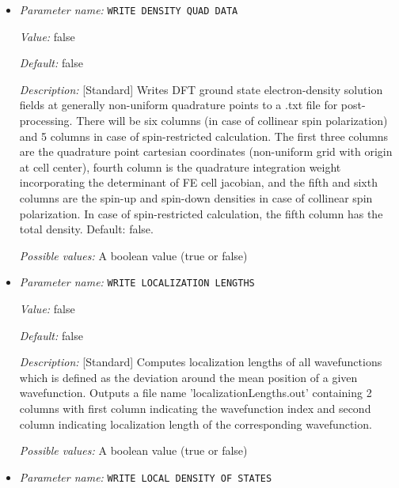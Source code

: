 \begin{itemize}
{\it Possible values:} A boolean value (true or false)
\item {\it Parameter name:} {\tt WRITE DENSITY QUAD DATA}
\label{parameters:Post_2dprocessing Options/WRITE DENSITY QUAD DATA}
\label{parameters:Post_2dprocessing_20Options/WRITE_20DENSITY_20QUAD_20DATA}


{\it Value:} false


{\it Default:} false


{\it Description:} [Standard] Writes DFT ground state electron-density solution fields at generally non-uniform quadrature points to a .txt file for post-processing. There will be six columns (in case of collinear spin polarization) and 5 columns in case of spin-restricted calculation. The first three columns are the quadrature point cartesian coordinates (non-uniform grid with origin at cell center), fourth column is the quadrature integration weight incorporating the determinant of FE cell jacobian, and the fifth and sixth columns are the spin-up and spin-down densities in case of collinear spin polarization. In case of spin-restricted calculation, the fifth column has the total density. Default: false.


{\it Possible values:} A boolean value (true or false)
\item {\it Parameter name:} {\tt WRITE LOCALIZATION LENGTHS}
\label{parameters:Post_2dprocessing Options/WRITE LOCALIZATION LENGTHS}
\label{parameters:Post_2dprocessing_20Options/WRITE_20LOCALIZATION_20LENGTHS}


{\it Value:} false


{\it Default:} false


{\it Description:} [Standard] Computes localization lengths of all wavefunctions which is defined as the deviation around the mean position of a given wavefunction. Outputs a file name 'localizationLengths.out' containing 2 columns with first column indicating the wavefunction index and second column indicating localization length of the corresponding wavefunction.


{\it Possible values:} A boolean value (true or false)
\item {\it Parameter name:} {\tt WRITE LOCAL DENSITY OF STATES}
\label{parameters:Post_2dprocessing Options/WRITE LOCAL DENSITY OF STATES}
\label{parameters:Post_2dprocessing_20Options/WRITE_20LOCAL_20DENSITY_20OF_20STATES}



\end{itemize}

